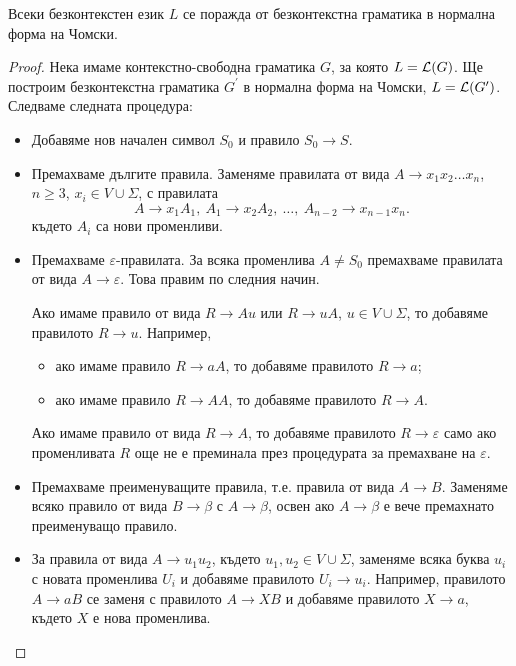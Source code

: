 \begin{framed}
  \begin{thm}
    Всеки безконтекстен език $L$ се поражда от безконтекстна граматика в нормална форма на Чомски.
  \end{thm}
\end{framed}
\begin{proof}
  Нека имаме контекстно-свободна граматика $G$, за която $L = \mathcal{L}(G)$.
  Ще построим безконтекстна граматика $G^\prime$ в нормална форма на Чомски, $L = \mathcal{L}(G^\prime)$.
  Следваме следната процедура:
  \begin{itemize}
  \item
    Добавяме нов начален символ $S_0$ и правило $S_0 \to S$.
  \item
    Премахваме дългите правила.
    Заменяме правилата от вида $A\to x_1x_2\dots x_n$, $n\geq 3$, $x_i \in V\cup\Sigma$, с
    правилата \[A\to x_1A_1,\ A_1\to x_2A_2,\ \dots,\ A_{n-2} \to x_{n-1}x_n.\]
    където $A_i$ са нови променливи.
  \item
    Премахваме $\varepsilon$-правилата.
    За всяка променлива $A \neq S_0$ премахваме правилата от вида $A\to\varepsilon$.
    Това правим по следния начин.
    
    Ако имаме правило от вида $R \to Au$ или $R\to u A$, $u \in V \cup \Sigma$,
    то добавяме правилото $R\to u$.
    Например, 
    \begin{itemize}
    \item 
      ако имаме правило $R\to aA$, то добавяме правилото $R \to a$;
    \item
      ако имаме правило $R\to AA$, то добавяме правилото $R \to A$.
    \end{itemize}
    Ако имаме правило от вида $R\to A$, то добавяме правилото $R\to\varepsilon$
    само ако променливата $R$ още не е преминала през процедурата за премахване на $\varepsilon$.
  \item
    Премахваме преименуващите правила, т.е. правила от вида $A\to B$.
    Заменяме всяко правило от вида $B \to \beta$ с $A\to \beta$,
    освен ако $A \to \beta$ е вече премахнато преименуващо правило.
  \item
    За правила от вида $A\to u_1 u_2$, където $u_1, u_2 \in V \cup \Sigma$, 
    заменяме всяка буква $u_i$ с новата променлива $U_i$
    и добавяме правилото $U_i\to u_i$.
    Например, правилото $A \to aB$ се заменя с правилото $A \to XB$ и добавяме правилото $X \to a$,
    където $X$ е нова променлива.
  \end{itemize}
\end{proof}

